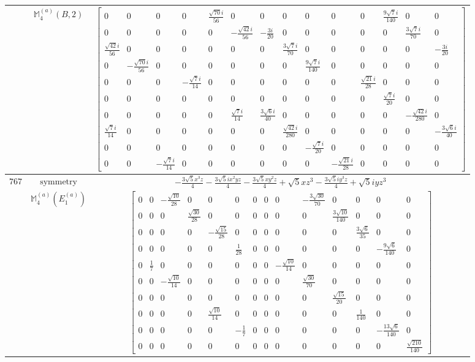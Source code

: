 \documentclass[fleqn,8pt,landscape]{jsarticle}
\begin{document}
\begin{longtable}{ccc}
$  $ & $ \mathbb{M}_{4}^{(a)}(B,2) $ & $ \begin{bmatrix} 0 & 0 & 0 & 0 & \frac{\sqrt{70} i}{56} & 0 & 0 & 0 & 0 & 0 & 0 & \frac{9 \sqrt{7} i}{140} & 0 & 0 \\ 0 & 0 & 0 & 0 & 0 & - \frac{\sqrt{42} i}{56} & - \frac{3 i}{20} & 0 & 0 & 0 & 0 & 0 & \frac{3 \sqrt{7} i}{70} & 0 \\ \frac{\sqrt{42} i}{56} & 0 & 0 & 0 & 0 & 0 & 0 & \frac{3 \sqrt{7} i}{70} & 0 & 0 & 0 & 0 & 0 & - \frac{3 i}{20} \\ 0 & - \frac{\sqrt{70} i}{56} & 0 & 0 & 0 & 0 & 0 & 0 & \frac{9 \sqrt{7} i}{140} & 0 & 0 & 0 & 0 & 0 \\ 0 & 0 & 0 & - \frac{\sqrt{7} i}{14} & 0 & 0 & 0 & 0 & 0 & 0 & \frac{\sqrt{21} i}{28} & 0 & 0 & 0 \\ 0 & 0 & 0 & 0 & 0 & 0 & 0 & 0 & 0 & 0 & 0 & \frac{\sqrt{7} i}{20} & 0 & 0 \\ 0 & 0 & 0 & 0 & 0 & \frac{\sqrt{7} i}{14} & \frac{3 \sqrt{6} i}{40} & 0 & 0 & 0 & 0 & 0 & - \frac{\sqrt{42} i}{280} & 0 \\ \frac{\sqrt{7} i}{14} & 0 & 0 & 0 & 0 & 0 & 0 & \frac{\sqrt{42} i}{280} & 0 & 0 & 0 & 0 & 0 & - \frac{3 \sqrt{6} i}{40} \\ 0 & 0 & 0 & 0 & 0 & 0 & 0 & 0 & - \frac{\sqrt{7} i}{20} & 0 & 0 & 0 & 0 & 0 \\ 0 & 0 & - \frac{\sqrt{7} i}{14} & 0 & 0 & 0 & 0 & 0 & 0 & - \frac{\sqrt{21} i}{28} & 0 & 0 & 0 & 0 \end{bmatrix} $ \\ \hline
$ 767 $ & $ \text{symmetry} $ & $ - \frac{3 \sqrt{5} x^{3} z}{4} - \frac{3 \sqrt{5} i x^{2} y z}{4} - \frac{3 \sqrt{5} x y^{2} z}{4} + \sqrt{5} x z^{3} - \frac{3 \sqrt{5} i y^{3} z}{4} + \sqrt{5} i y z^{3} $ \\
$  $ & $ \mathbb{M}_{4}^{(a)}(E_{1}^{(a)}) $ & $ \begin{bmatrix} 0 & 0 & - \frac{\sqrt{10}}{28} & 0 & 0 & 0 & 0 & 0 & 0 & - \frac{3 \sqrt{30}}{70} & 0 & 0 & 0 & 0 \\ 0 & 0 & 0 & \frac{\sqrt{30}}{28} & 0 & 0 & 0 & 0 & 0 & 0 & \frac{3 \sqrt{10}}{140} & 0 & 0 & 0 \\ 0 & 0 & 0 & 0 & - \frac{\sqrt{15}}{28} & 0 & 0 & 0 & 0 & 0 & 0 & \frac{3 \sqrt{6}}{35} & 0 & 0 \\ 0 & 0 & 0 & 0 & 0 & \frac{1}{28} & 0 & 0 & 0 & 0 & 0 & 0 & - \frac{9 \sqrt{6}}{140} & 0 \\ 0 & \frac{1}{7} & 0 & 0 & 0 & 0 & 0 & 0 & - \frac{\sqrt{10}}{14} & 0 & 0 & 0 & 0 & 0 \\ 0 & 0 & - \frac{\sqrt{10}}{14} & 0 & 0 & 0 & 0 & 0 & 0 & \frac{\sqrt{30}}{70} & 0 & 0 & 0 & 0 \\ 0 & 0 & 0 & 0 & 0 & 0 & 0 & 0 & 0 & 0 & \frac{\sqrt{15}}{20} & 0 & 0 & 0 \\ 0 & 0 & 0 & 0 & \frac{\sqrt{10}}{14} & 0 & 0 & 0 & 0 & 0 & 0 & \frac{1}{140} & 0 & 0 \\ 0 & 0 & 0 & 0 & 0 & - \frac{1}{7} & 0 & 0 & 0 & 0 & 0 & 0 & - \frac{13 \sqrt{6}}{140} & 0 \\ 0 & 0 & 0 & 0 & 0 & 0 & 0 & 0 & 0 & 0 & 0 & 0 & 0 & \frac{\sqrt{210}}{140} \end{bmatrix} $ \\ \hline

\end{longtable}
\end{document}
